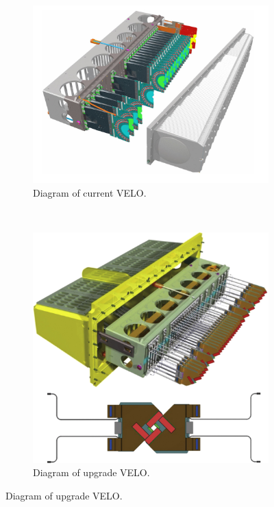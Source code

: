 \begin{figure}[ht] %
\centering
\begin{subfigure}[t]{0.45\textwidth}
\centering
\includegraphics[width=\textwidth]{CurrentVelo}
\caption{Diagram of current VELO.} 
\label{fig:CurrentVelo} 
\end{subfigure}
~
\begin{subfigure}[t]{0.45\textwidth}
\includegraphics[width=\textwidth]{UpgradeVELO}
\caption{Diagram of upgrade VELO.} 
\label{fig:UpgradeVELO}
\end{subfigure}
\end{figure}

